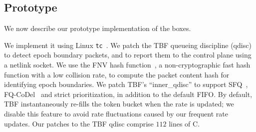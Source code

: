 

\subsection{Prototype}\label{s:impl:prototype}

We now describe our prototype implementation of the \name boxes.

 We implement it using Linux \texttt{tc}~\cite{tc}.
We patch the TBF queueing discipline (qdisc)~\cite{tbf} to detect epoch boundary packets, and to report them to the control plane using a netlink socket. We use the FNV hash function~\cite{fnv-hash}, a non-cryptographic fast hash function with a low collision rate, to compute the packet content hash for identifying epoch boundaries.
We patch TBF's ``inner\_qdisc'' to support SFQ~\cite{sfq}, FQ-CoDel~\cite{fq-codel} and strict prioritization, in addition to the default FIFO. 
By default, TBF instantaneously re-fills the token bucket when the rate is updated; we disable this feature to avoid rate fluctuations caused by our frequent rate updates. 
Our patches to the TBF qdisc comprise $112$ lines of C.

